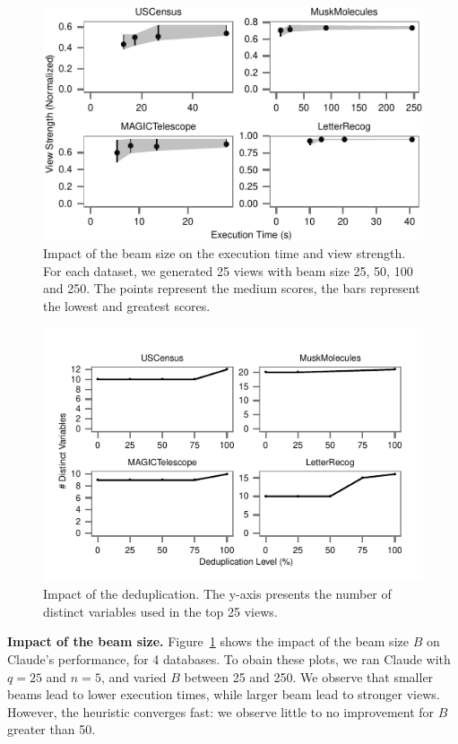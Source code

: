 \begin{figure}[t!]
\centering
\includegraphics[width=\columnwidth]{plots/view-vary-beam}
\caption{Impact of the beam size on the execution time and view strength. For
each dataset, we generated 25 views with beam size 25, 50, 100 and 250. The
points represent the medium scores, the bars represent the lowest and greatest
scores.}
\label{pic:view-beam}
\end{figure}
\begin{figure}[t!]
\centering
\includegraphics[width=\columnwidth]{plots/view-vary-diversification}
\caption{Impact of the deduplication. The y-axis presents the number of
distinct variables used in the top 25 views.}
\label{pic:view-diversification}
\end{figure}
\textbf{Impact of the beam size.} Figure~\ref{pic:view-beam} shows the impact
of the beam size $B$ on Claude's performance, for 4 databases. To obain these
plots, we ran Claude with $q=25$ and $n=5$, and varied $B$ between 25 and 250.
We observe that smaller beams lead to lower execution times, while larger beam
lead to stronger views. However, the heuristic converges fast: we observe
little to no improvement for $B$ greater than 50.

